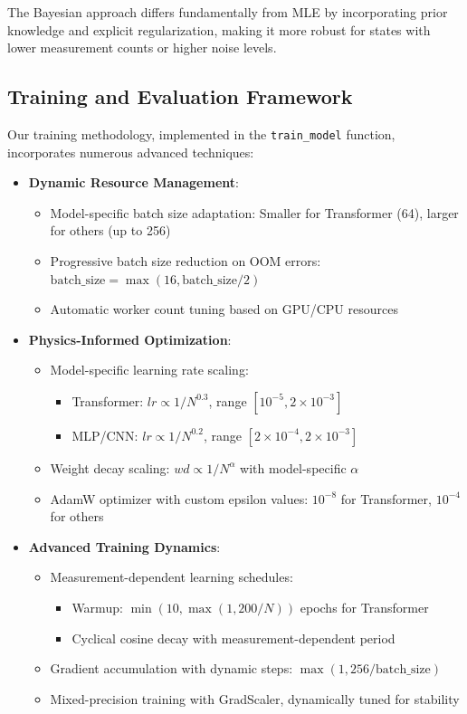 \documentclass{optica-article}
\begin{document}
The Bayesian approach differs fundamentally from MLE by incorporating prior knowledge and explicit regularization, making it more robust for states with lower measurement counts or higher noise levels.

\subsection{Training and Evaluation Framework}

Our training methodology, implemented in the \texttt{train\_model} function, incorporates numerous advanced techniques:

\begin{itemize}
\item \textbf{Dynamic Resource Management}:
\begin{itemize}
\item Model-specific batch size adaptation: Smaller for Transformer (64), larger for others (up to 256)
\item Progressive batch size reduction on OOM errors: $\text{batch\_size} = \max(16, \text{batch\_size}/2)$
\item Automatic worker count tuning based on GPU/CPU resources
\end{itemize}

\item \textbf{Physics-Informed Optimization}:
\begin{itemize}
\item Model-specific learning rate scaling:
\begin{itemize}
\item Transformer: $lr \propto 1/N^{0.3}$, range $[10^{-5}, 2\times10^{-3}]$
\item MLP/CNN: $lr \propto 1/N^{0.2}$, range $[2\times10^{-4}, 2\times10^{-3}]$
\end{itemize}
\item Weight decay scaling: $wd \propto 1/N^\alpha$ with model-specific $\alpha$
\item AdamW optimizer with custom epsilon values: $10^{-8}$ for Transformer, $10^{-4}$ for others
\end{itemize}

\item \textbf{Advanced Training Dynamics}:
\begin{itemize}
\item Measurement-dependent learning schedules:
\begin{itemize}
\item Warmup: $\min(10, \max(1, 200/N))$ epochs for Transformer
\item Cyclical cosine decay with measurement-dependent period
\end{itemize}
\item Gradient accumulation with dynamic steps: $\max(1, 256/\text{batch\_size})$
\item Mixed-precision training with GradScaler, dynamically tuned for stability
\end{itemize}


\end{itemize}
\end{document}
